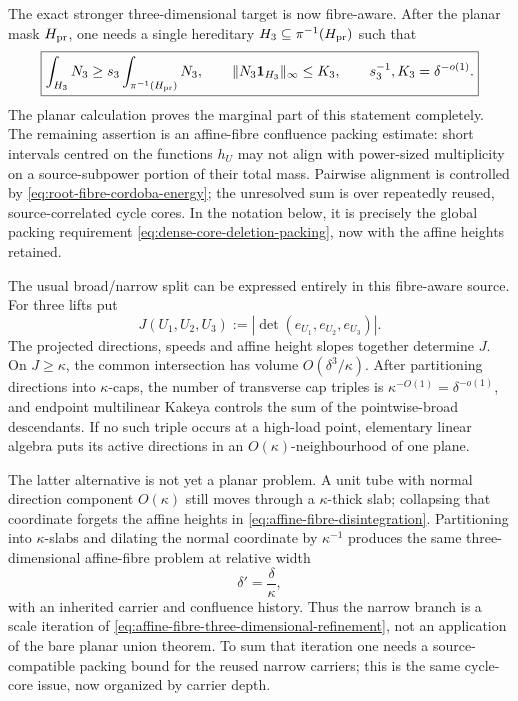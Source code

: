 \documentclass[11pt]{article}
\begin{document}
The exact stronger three-dimensional target is now fibre-aware.  After the
planar mask \(H_{\rm pr}\), one needs a single hereditary
\(H_3\subseteq\pi^{-1}(H_{\rm pr})\) such that
\begin{equation}\label{eq:affine-fibre-three-dimensional-refinement}
 \boxed{
  \int_{H_3}N_3
  \ge s_3\int_{\pi^{-1}(H_{\rm pr})}N_3,
  \qquad
  \|N_3{\bf1}_{H_3}\|_\infty\le K_3,
  \qquad
  s_3^{-1},K_3=\delta^{-o(1)}.}
\end{equation}
The planar calculation proves the marginal part of this statement completely.
The remaining assertion is an affine-fibre confluence packing estimate:
short intervals centred on the functions \(h_U\) may not align with
power-sized multiplicity on a source-subpower portion of their total mass.
Pairwise alignment is controlled by \eqref{eq:root-fibre-cordoba-energy}; the
unresolved sum is over repeatedly reused, source-correlated cycle cores.  In
the notation below, it is precisely the global packing requirement
\eqref{eq:dense-core-deletion-packing}, now with the affine heights retained.

The usual broad/narrow split can be expressed entirely in this fibre-aware
source.  For three lifts put
\begin{equation}\label{eq:affine-fibre-transversality}
 J(U_1,U_2,U_3)
 :=|\det(e_{U_1},e_{U_2},e_{U_3})|.
\end{equation}
The projected directions, speeds and affine height slopes together determine
\(J\).  On \(J\ge\kappa\), the common intersection has volume
\(O(\delta^3/\kappa)\).  After partitioning directions into
\(\kappa\)-caps, the number of transverse cap triples is
\(\kappa^{-O(1)}=\delta^{-o(1)}\), and endpoint multilinear Kakeya
\cite{BCT06,Guth10} controls the sum of the pointwise-broad descendants.  If no such
triple occurs at a high-load point, elementary linear algebra puts its active
directions in an \(O(\kappa)\)-neighbourhood of one plane.

The latter alternative is not yet a planar problem.  A unit tube with normal
direction component \(O(\kappa)\) still moves through a \(\kappa\)-thick slab;
collapsing that coordinate forgets the affine heights in
\eqref{eq:affine-fibre-disintegration}.  Partitioning into \(\kappa\)-slabs
and dilating the normal coordinate by \(\kappa^{-1}\) produces the same
three-dimensional affine-fibre problem at relative width
\begin{equation}\label{eq:affine-fibre-narrow-rescaling}
 \delta'=\frac{\delta}{\kappa},
\end{equation}
with an inherited carrier and confluence history.  Thus the narrow branch is
a scale iteration of \eqref{eq:affine-fibre-three-dimensional-refinement},
not an application of the bare planar union theorem.  To sum that iteration
one needs a source-compatible packing bound for the reused narrow carriers;
this is the same cycle-core issue, now organized by carrier depth.
\end{document}
